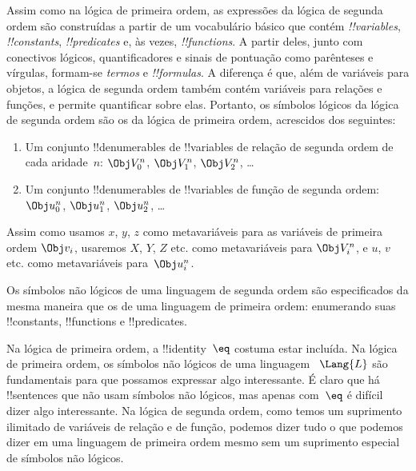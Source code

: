 \documentclass[../../../include/open-logic-section]{subfiles}
\begin{document}


Assim como na lógica de primeira ordem, as expressões da lógica de segunda
ordem são construídas a partir de um vocabulário básico que contém
\emph{!!{variable}s}, \emph{!!{constant}s}, \emph{!!{predicate}s} e, às
vezes, \emph{!!{function}s}. A partir deles, junto com conectivos lógicos,
quantificadores e sinais de pontuação como parênteses e vírgulas, formam-se
\emph{termos} e \emph{!!{formula}s}. A diferença é que, além de variáveis
para objetos, a lógica de segunda ordem também contém variáveis para
relações e funções, e permite quantificar sobre elas. Portanto, os símbolos
lógicos da lógica de segunda ordem são os da lógica de primeira ordem,
acrescidos dos seguintes:

\begin{enumerate}
\item Um conjunto !!{denumerable}s de !!{variable}s de relação de segunda
  ordem de cada aridade~$n$: $\Obj V_0^n$, $\Obj V_1^n$, $\Obj V_2^n$,
  \dots
\item Um conjunto !!{denumerable}s de !!{variable}s de função de segunda
  ordem: $\Obj u_0^n$, $\Obj u_1^n$, $\Obj u_2^n$, \dots
\end{enumerate}

Assim como usamos $x$, $y$, $z$ como metavariáveis para as variáveis de
primeira ordem $\Obj v_i$, usaremos $X$, $Y$, $Z$ etc. como metavariáveis
para $\Obj V_i^n$, e $u$, $v$ etc. como metavariáveis para~$\Obj u_i^n$.

\begin{explain}
Os símbolos não lógicos de uma linguagem de segunda ordem são especificados
da mesma maneira que os de uma linguagem de primeira ordem: enumerando suas
!!{constant}s, !!{function}s e !!{predicate}s.

Na lógica de primeira ordem, a !!{identity}~$\eq$ costuma estar incluída.
Na lógica de primeira ordem, os símbolos não lógicos de uma linguagem
~$\Lang{L}$ são fundamentais para que possamos expressar algo interessante.
É claro que há !!{sentence}s que não usam símbolos não lógicos, mas apenas
com~$\eq$ é difícil dizer algo interessante. Na lógica de segunda ordem,
como temos um suprimento ilimitado de variáveis de relação e de função,
podemos dizer tudo o que podemos dizer em uma linguagem de primeira ordem
mesmo sem um suprimento especial de símbolos não lógicos.
\end{explain}
\end{document}
